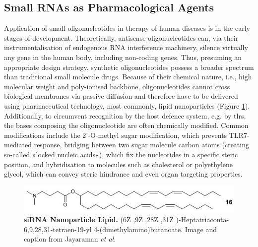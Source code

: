 \subsection{Small RNAs as Pharmacological Agents} \label{sec:discussion:smrna-therapy}
Application of small oligonucleotides in therapy of human diseases is in the early stages of development. Theoretically, antisense oligonucleotides can, via their instrumentalisation of endogenous RNA interference machinery, silence virtually any gene in the human body, including non-coding genes. Thus, presuming an appropriate design strategy, synthetic oligonucleotides possess a broader spectrum than traditional small molecule drugs. Because of their chemical nature, i.e., high molecular weight and poly-ionised backbone, oligonucleotides cannot cross biological membranes via passive diffusion and therefore have to be delivered using pharmaceutical technology, most commonly, lipid nanoparticles (Figure \ref{fig:lipid}).\cite{Akhtar2007, Whitehead2009} Additionally, to circumvent recognition by the host defence system, e.g. by \acp{tlr}, the bases composing the oligonucleotide are often chemically modified. Common modifications include the 2'-O-methyl sugar modification, which prevents TLR7-mediated response, bridging between two sugar molecule carbon atoms (creating so-called »locked nucleic acids«), which fix the nucleotides in a specific steric position, and hybridisation to molecules such as cholesterol or polyethylene glycol, which can convey steric hindrance and even organ targeting properties.\cite{Whitehead2009}

\begin{figure}
\includegraphics[width=\textwidth]{figures/mfig004}
\caption[siRNA Nanoparticle Lipid.]{\textbf{siRNA Nanoparticle Lipid.} (6Z ,9Z ,28Z ,31Z )-Heptatriaconta-6,9,28,31-tetraen-19-yl 4-(dimethylamino)butanoate. Image and caption from Jayaraman \emph{et al.}\cite{Jayaraman2012}
\label{fig:lipid}}
\end{figure}


